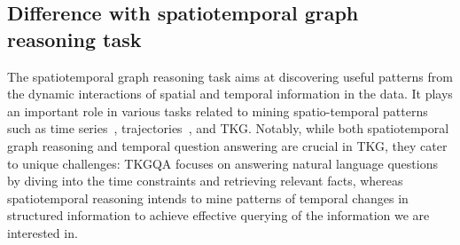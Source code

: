 \documentclass[10pt, a4paper]{article}
\begin{document}
\subsection{Difference with spatiotemporal graph reasoning task}
The spatiotemporal graph reasoning task aims at discovering useful patterns from the dynamic interactions of spatial and temporal information in the data. It plays an important role in various tasks related to mining spatio-temporal patterns such as time series~\cite{shao}, trajectories~\cite{qian}, and TKG. Notably, while both spatiotemporal graph reasoning and temporal question answering are crucial in TKG, they cater to unique challenges: TKGQA focuses on answering natural language questions by diving into the time constraints and retrieving relevant facts, whereas spatiotemporal reasoning intends to mine patterns of temporal changes in structured information to achieve effective querying of the information we are interested in.
\end{document}
